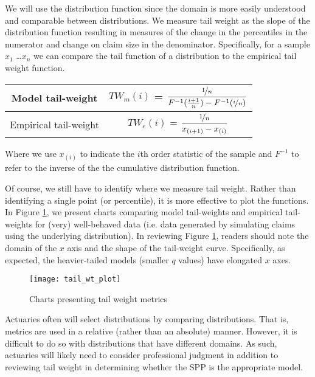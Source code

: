 We will use the distribution function since the domain is more easily understood and comparable between distributions. We measure tail weight as the slope of the distribution function resulting in measures of the change in the percentiles in the numerator and change on claim size in the denominator. Specifically, for a sample $x_1$ \ldots $x_n$ we can compare the tail function of a distribution to the empirical tail weight function.
\begin{table}[h!]
	\centering
	\begin{tabular}[h]{cc}
	\toprule
	Model tail-weight & $TW_m(i)$ = 
	$\dfrac{
		\nicefrac{1}{n} %
	}{
		F^{-1}(\frac{i+1}{n}) %
		- F^{-1}(\nicefrac{i}{n}) %
	}$\\
	\midrule
	Empirical tail-weight & $TW_e(i)$ = 
	$\dfrac{
		\nicefrac{1}{n}
	}{
		{x_{(i+1)}}-{x_{(i)}}
	}$\\
	\bottomrule
	\end{tabular}
\end{table}

Where we use $x_{(i)}$ to indicate the $i$th order statistic of the sample and $F^{-1}$ to refer to the inverse of the the cumulative distribution function.

Of course, we still have to identify where we measure tail weight. Rather than identifying a single point (or percentile), it is more effective to plot the functions. In Figure \ref{fig:tailwtplot}, we present charts comparing model tail-weights and empirical tail-weights for (very) well-behaved data (i.e. data generated by simulating claims using the underlying distribution). In reviewing Figure \ref{fig:tailwtplot}, readers should note the domain of the $x$ axis and the shape of the tail-weight curve. Specifically, as expected, the heavier-tailed models (smaller $q$ values) have elongated $x$ axes.

\begin{figure}[h]
	\centering
	\texttt{[image: tail\_wt\_plot]}
	\caption[Tail Weights]{Charts presenting tail weight metrics}
	\label{fig:tailwtplot}
\end{figure}


Actuaries often will select distributions by comparing distributions. That is, metrics are used in a relative (rather than an absolute) manner. However, it is difficult to do so with distributions that have different domains. As such, actuaries will likely need to consider professional judgment in addition to reviewing tail weight in determining whether the SPP is the appropriate model.

